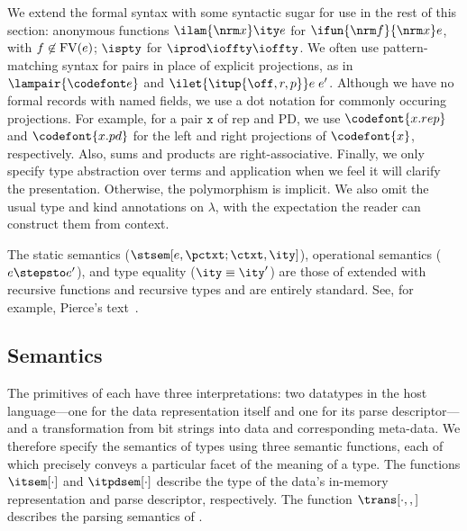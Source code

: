 We extend the formal syntax with some syntactic sugar for use in the
rest of this section: anonymous functions $\ilam {\nrm x} \ity e$ for
$\ifun {\nrm f} {\nrm x} e$, with $f \not\in {\rm FV}(e)$; $\ispty$
for $\iprod \ioffty \ioffty$.  We often use pattern-matching syntax
for pairs in place of explicit projections, as in $\lampair{\codefont
  e}$ and $\ilet {\itup{\off,r,p}} e\; e'$.  Although we have no
formal records with named fields, we use a dot notation for commonly
occuring projections. For example, for a pair $\mathtt x$ of rep and
PD, we use $\codefont{x.rep}$ and $\codefont{x.pd}$ for the left and
right projections of $\codefont{x}$, respectively. Also, sums and
products are right-associative.  Finally, we only specify type
abstraction over terms and application when we feel it will clarify
the presentation. Otherwise, the polymorphism is implicit.  We also
omit the usual type and kind annotations on $\lambda$, with the
expectation the reader can construct them from context.  

The static semantics ($\stsem[e,{\pctxt;\ctxt},\ity]$), operational
semantics ($e \stepsto e'$), and type 
equality ($\ity \equiv \ity'$) are those of \fomega{} extended with
recursive functions and recursive types and are entirely standard.
See, for example, Pierce's text~\cite{pierce:tapl}.

\subsection{\ddc{} Semantics}
\label{sec:ddc-sem}

The primitives of \ddc{} each have three interpretations: two
datatypes in the host language---one for the data representation
itself and one for its parse descriptor---and a transformation from
bit strings into data and corresponding
meta-data.  We therefore specify the semantics of \ddc{} types using three semantic
functions, each of which precisely conveys a particular facet of the
meaning of a type.  The functions $\itsem[\cdot]$ and $\itpdsem[\cdot]$
describe the type of the data's in-memory representation and 
parse descriptor, respectively. The
function $\trans[\cdot,,]$ describes the parsing semantics of
\ddc{}.

